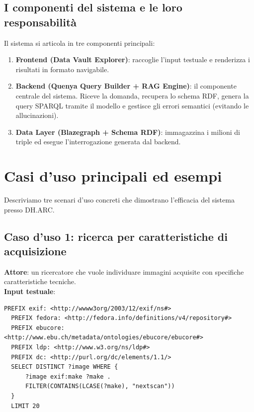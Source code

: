     \subsection{I componenti del sistema e le loro responsabilità}\label{subsec:componenti}
        Il sistema si articola in tre componenti principali:
        \begin{enumerate}
            \item \textbf{Frontend (Data Vault Explorer)}: raccoglie l'input testuale e renderizza i risultati in formato navigabile.
            \item \textbf{Backend (Quenya Query Builder + RAG Engine)}: il componente centrale del sistema. Riceve la domanda, recupera lo schema RDF, genera la query SPARQL tramite il modello e gestisce gli errori semantici (evitando le allucinazioni).
            \item \textbf{Data Layer (Blazegraph + Schema RDF)}: immagazzina i milioni di triple ed esegue l'interrogazione generata dal backend.
        \end{enumerate}

\section{Casi d'uso principali ed esempi}\label{sec:casiduso}

    Descriviamo tre scenari d'uso concreti che dimostrano l'efficacia del sistema presso DH.ARC.\@
\newpage
    \subsection{Caso d'uso 1: ricerca per caratteristiche di acquisizione}\label{subsec:cu1}
        \textbf{Attore}: un ricercatore che vuole individuare immagini acquisite con specifiche caratteristiche tecniche.\\
        \textbf{Input testuale}: 
        \begin{center}
        \end{center}
        \vspace{0.5em}

        \begin{lstlisting}[language=sparql, caption=Caso d'uso 1: Query SPARQL generata e sanitizzata, basicstyle=\ttfamily\scriptsize, breaklines=true]
  PREFIX exif: <http://wwww3org/2003/12/exif/ns#>
  PREFIX fedora: <http://fedora.info/definitions/v4/repository#>
  PREFIX ebucore: <http://www.ebu.ch/metadata/ontologies/ebucore/ebucore#>
  PREFIX ldp: <http://www.w3.org/ns/ldp#>
  PREFIX dc: <http://purl.org/dc/elements/1.1/>
  SELECT DISTINCT ?image WHERE {
      ?image exif:make ?make .
      FILTER(CONTAINS(LCASE(?make), "nextscan"))
  }
  LIMIT 20\end{lstlisting}

